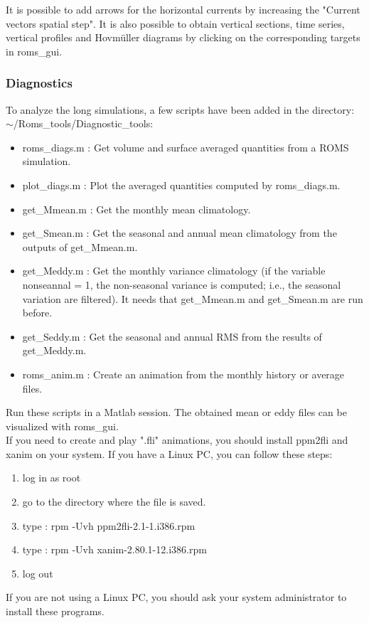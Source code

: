 It is possible to add arrows for the horizontal currents by increasing the "Current vectors 
spatial step". It is also possible to obtain vertical sections, time series, vertical profiles
and Hovm\"uller diagrams by clicking on the corresponding targets in roms\_gui.

\subsubsection{Diagnostics}

To analyze the long simulations,
a few scripts have been added in the directory: \\
$\sim$/Roms\_tools/Diagnostic\_tools:
\begin{itemize}
\item roms\_diags.m : Get volume and surface averaged quantities from a ROMS simulation.
\item plot\_diags.m :  Plot the averaged quantities computed by roms\_diags.m.
\item get\_Mmean.m  : Get the monthly mean climatology.
\item get\_Smean.m  : Get the seasonal and annual mean climatology from the outputs of
get\_Mmean.m.
\item get\_Meddy.m  : Get the monthly variance climatology (if the variable nonseannal = 1, 
the non-seasonal variance is computed; i.e., the seasonal variation are 
filtered). It needs that get\_Mmean.m and get\_Smean.m are run before.
\item get\_Seddy.m  : Get the seasonal and annual RMS from the results of 
get\_Meddy.m.
\item roms\_anim.m  : Create an animation from the monthly  history or average files.
\end{itemize}
Run these scripts in a Matlab session.
The obtained mean or eddy files can be visualized with roms\_gui.\\

If you need to create and play ".fli" animations, you should install ppm2fli
and xanim on your system. If you have a Linux PC, you can follow these steps:
\begin{enumerate}
\item log in as root
\item go to the directory where the file is saved.
\item type : rpm -Uvh  ppm2fli-2.1-1.i386.rpm
\item type : rpm -Uvh  xanim-2.80.1-12.i386.rpm
\item log out
\end{enumerate}
If you are not using a Linux PC, you should ask your 
system administrator to install these programs.\\\\
